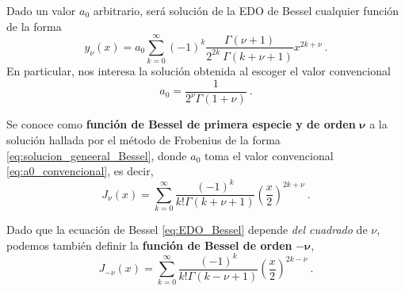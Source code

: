Dado un valor $a_0$ arbitrario, será solución de la EDO de Bessel cualquier función de la forma
\begin{equation} \label{eq:solucion_geneeral_Bessel}
    y_\nu(x) = a_0 \sum_{k = 0}^\infty (-1)^k \frac{\Gamma(\nu + 1)}{2^{2k} \ \Gamma(k + \nu + 1)} x^{2k + \nu} \ .
\end{equation}
En particular, nos interesa la solución obtenida al escoger el valor convencional
%
%
\begin{equation} \label{eq:a0_convencional}
    a_0 = \frac{1}{2^\nu \Gamma(1+\nu)} \ .
\end{equation}
%
\begin{defi} 
    Se conoce como \textbf{función de Bessel de primera especie y de orden} $\boldsymbol{\nu}$ a la solución hallada por el método de Frobenius de la forma \eqref{eq:solucion_geneeral_Bessel}, donde $a_0$ toma el valor convencional \eqref{eq:a0_convencional}, es decir,
    \begin{equation} \label{eq:Bessel_primera_especie}
        J_\nu (x) = \sum_{k=0}^\infty \frac{(-1)^k}{k! \Gamma(k+\nu+1)} \left(\frac{x}{2}\right)^{2k+\nu} \ .
    \end{equation}

    Dado que la ecuación de Bessel \eqref{eq:EDO_Bessel} depende \emph{del cuadrado} de $\nu$, podemos también definir la \textbf{función de Bessel de orden} $\mathbf{-}\boldsymbol{\nu}$, 
    \begin{equation}
        J_{-\nu} (x) = \sum_{k=0}^\infty \frac{(-1)^k}{k! \Gamma(k-\nu+1)} \left(\frac{x}{2}\right)^{2k-\nu} \ .
    \end{equation}
\end{defi}

